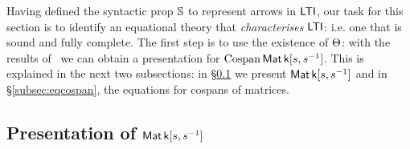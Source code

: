 Having defined the syntactic prop $\mathbb{S}$ to represent arrows in $\operatorname{\mathsf{LTI}}$, our
task for this section is to identify an equational theory that
\emph{characterises} $\operatorname{\mathsf{LTI}}$: i.e. one that is sound and fully complete. The
first step is to use the existence of $\Theta$: with the results
of~\cite{BSZ2,Za} we can obtain a presentation for $\operatorname{{Cospan}}\operatorname{\mathsf{Mat}}{\mathsf{k}[s,s^{-1}]}$. This is
explained in the next two subsections: in \S\ref{subsec:eqhopf} we present
$\operatorname{\mathsf{Mat}}{\mathsf{k}[s,s^{-1}]}$ and in \S\ref{subsec:eqcospan}, the equations for cospans of matrices.


\subsection{Presentation of $\operatorname{\mathsf{Mat}}{\mathsf{k}[s,s^{-1}]}$}\label{subsec:eqhopf}


